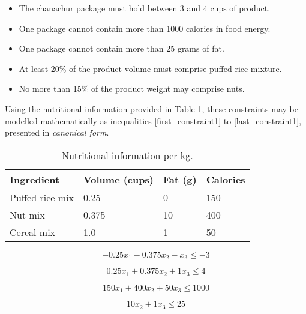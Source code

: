 \documentclass[11pt, a4paper]{article}
\begin{document}
    \begin{itemize}
        \item The chanachur package must hold between 3 and 4 cups of product.
        \item One package cannot contain more than 1000 calories in food energy.
        \item One package cannot contain more than 25 grams of fat.
        \item At least 20\% of the product volume must comprise puffed rice mixture.
        \item No more than 15\% of the product weight may comprise nuts.
    \end{itemize}

    Using the nutritional information provided in Table \ref{nutrients}, these constraints may be modelled mathematically as inequalities \ref{first_constraint1} to \ref{last_constraint1}, presented in \textit{canonical form}.

    \begin{table}[!ht]
        \centering
        \caption{Nutritional information per kg.}
        \begin{tabular}{|l|l|l|l|}
            \hline
            Ingredient      & Volume (cups)     & Fat (g)   & Calories  \\ \hline
            Puffed rice mix & 0.25              & 0         & 150       \\ \hline
            Nut mix         & 0.375             & 10        & 400       \\ \hline
            Cereal mix      & 1.0               & 1         & 50        \\ \hline          
        \end{tabular}
        \label{nutrients}
    \end{table}

    \begin{equation}
        -0.25x_1 - 0.375x_2 - x_3 \leq -3
        \label{first_constraint1}
    \end{equation}

    \begin{equation}
        0.25x_1 + 0.375x_2 + 1x_3 \leq 4
    \end{equation}
    
    \begin{equation}
        150x_1 + 400x_2 + 50x_3 \leq 1000
    \end{equation}

    \begin{equation}
        10x_2 + 1x_3 \leq 25
    \end{equation}
\end{document}
